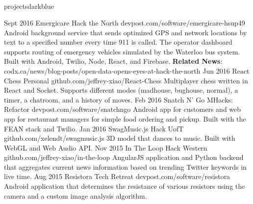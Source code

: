 \documentclass{resume}
\begin{document}
\begin{main}
		\section{\faFolder}{projects}{darkblue}
			\begin{entrylist}
				\rightentry%
					{Sept 2016}%
					{Emergicare}%
					{Hack the North}%
					{devpost.com/software/emergicare-hsup49}%
					{Android background service that sends optimized GPS and network locations by text to a specified number every time 911 is called. The operator dashboard supports routing of emergency vehicles simulated by the Waterloo bus system. Built with Android, Twilio, Node, React, and Firebase. \textbf{Related News}: \color{darkblue}codx.ca/news/blog-posts/open-data-opens-eyes-at-hack-the-north}
				\rightentry%
					{Jun 2016}%
					{React Chess}%
					{Personal}%
					{github.com/jeffrey-xiao/React-Chess}%
					{Multiplayer chess written in React and Socket. Supports different modes (madhouse, bughouse, normal), a timer, a chatroom, and a history of moves.}
				\rightentry%
					{Feb 2016}%
					{Snatch N' Go}%
					{MHacks: Refactor}%
					{devpost.com/software/snatchngo}%
					{Android app for customers and web app for restaurant managers for simple food ordering and pickup. Built with the FEAN stack and Twilio.}
				\rightentry%
					{Jan 2016}%
					{SwagMusic.js}%
					{Hack UofT}%
					{github.com/xelendt/swagmusic.js}%
					{3D model that dances to music. Built with WebGL and Web Audio API.}
				\rightentry%
					{Nov 2015}%
					{In The Loop}%
					{Hack Western}%
					{github.com/jeffrey-xiao/in-the-loop}%
					{AngularJS application and Python backend that aggregates current news information based on trending Twitter keywords in live time.}
				\rightentry%
					{Aug 2015}%
					{Resistora}%
					{Tech Retreat}%
					{devpost.com/software/resistora}%
					{Android application that determines the resistance of various resistors using the camera and a custom image analysis algorithm.}
			\end{entrylist}	
	\end{main}
\end{document}
